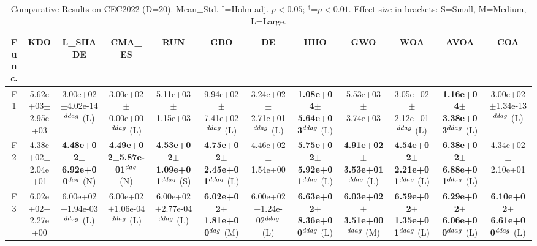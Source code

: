 \begin{table}[!t]
\centering\small
\caption{Comparative Results on CEC2022 (D=20). Mean$\pm$Std. $^{\dag}$=Holm-adj. $p<0.05$; $^{\ddag}$=$p<0.01$. Effect size in brackets: S=Small, M=Medium, L=Large.}
\label{tab:enhanced}
\begin{tabular}{c|ccccccccccc}
\hline
Func. & \textbf{KDO} & L_SHADE & CMA_ES & RUN & GBO & DE & HHO & GWO & WOA & AVOA & COA \\ \hline\hline
F1  & 5.62e+03$\pm$2.95e+03  & 3.00e+02$\pm$4.02e-14$^{\\ddag}$ (L)  & 3.00e+02$\pm$0.00e+00$^{\\ddag}$ (L)  & 5.11e+03$\pm$1.15e+03   & 9.94e+02$\pm$7.41e+02$^{\\ddag}$ (L)  & 3.24e+02$\pm$2.71e+01$^{\\ddag}$ (L)  & \textbf{1.08e+04$\pm$5.64e+03}$^{\\ddag}$ (L)  & 5.53e+03$\pm$3.74e+03   & 3.05e+02$\pm$2.12e+01$^{\\ddag}$ (L)  & \textbf{1.16e+04$\pm$3.38e+03}$^{\\ddag}$ (L)  & 3.00e+02$\pm$1.34e-13$^{\\ddag}$ (L) \\ \hline
F2  & 4.38e+02$\pm$2.04e+01  & \textbf{4.48e+02$\pm$6.92e+00}$^{\\dag}$ (N)  & \textbf{4.49e+02$\pm$5.87e-01}$^{\\dag}$ (N)  & \textbf{4.53e+02$\pm$1.09e+01}$^{\\ddag}$ (S)  & \textbf{4.75e+02$\pm$2.45e+01}$^{\\ddag}$ (L)  & 4.46e+02$\pm$1.54e+00   & \textbf{5.75e+02$\pm$5.92e+01}$^{\\ddag}$ (L)  & \textbf{4.91e+02$\pm$3.53e+01}$^{\\ddag}$ (L)  & \textbf{4.54e+02$\pm$2.21e+01}$^{\\ddag}$ (L)  & \textbf{6.38e+02$\pm$6.88e+01}$^{\\ddag}$ (L)  & 4.34e+02$\pm$2.10e+01  \\ \hline
F3  & 6.02e+02$\pm$2.27e+00  & 6.00e+02$\pm$1.94e-03$^{\\ddag}$ (L)  & 6.00e+02$\pm$1.06e-04$^{\\ddag}$ (L)  & 6.00e+02$\pm$2.77e-04$^{\\ddag}$ (L)  & \textbf{6.02e+02$\pm$1.81e+00}$^{\\dag}$ (M)  & 6.00e+02$\pm$1.24e-02$^{\\ddag}$ (L)  & \textbf{6.63e+02$\pm$8.36e+00}$^{\\ddag}$ (L)  & \textbf{6.03e+02$\pm$3.51e+00}$^{\\ddag}$ (M)  & \textbf{6.59e+02$\pm$1.35e+01}$^{\\ddag}$ (L)  & \textbf{6.29e+02$\pm$6.06e+00}$^{\\ddag}$ (L)  & \textbf{6.10e+02$\pm$6.61e+00}$^{\\ddag}$ (L) \\ \hline

\end{tabular}
\end{table}
